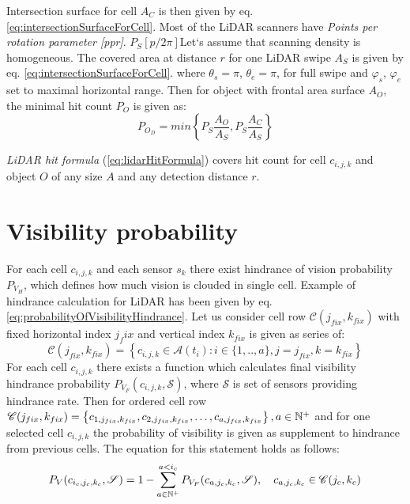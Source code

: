 \noindent Intersection surface for cell $A_C$ is then given by eq. \ref{eq:intersectionSurfaceForCell}. Most of the LiDAR scanners have \textit{Points per rotation parameter [ppr]}. $P_S[p/2\pi]$Let`s  assume that scanning density is homogeneous. The covered area at distance $r$ for one LiDAR swipe $A_S$ is given by eq. \ref{eq:intersectionSurfaceForCell}. where $\theta_s=\pi$, $\theta_e=\pi$, for full swipe and $\varphi_s$, $\varphi_e$ set to maximal horizontal range. Then for object with frontal area surface $A_O$, the minimal hit count $P_O$ is given as:
\begin{equation}\label{eq:lidarHitFormula}
    P_{O_D} = \textit{min} \left\{P_S\frac{A_O}{A_S},P_S\frac{A_C}{A_S}\right\}
\end{equation}

\noindent \textit{LiDAR hit formula} (\ref{eq:lidarHitFormula}) covers hit count for cell $c_{i,j,k}$ and object $O$ of any size $A$ and any detection distance $r$.

\section{Visibility probability}\label{sec:visibilityProbability}
\noindent For each cell $c_{i,j,k}$ and each sensor $s_k$ there exist hindrance of vision probability $P_{V_H}$, which defines how much vision is clouded in single cell. Example of hindrance calculation for LiDAR has been given by eq. \ref{eq:probabilityOfVisibilityHindrance}. Let us consider cell row $\mathscr{C}(j_{fix},k_{fix})$ with fixed horizontal index $j_fix$ and vertical index $k_{fix}$ is given as series of:
\begin{equation}\label{eq:cellrowDefinition}
    \mathscr{C}(j_{fix},k_{fix})= \left\{c_{i,j,k}\in\mathscr{A}(t_i):i\in\{1,..,a\},j=j_{fix},k=k_{fix}\right\}
\end{equation}
For each cell $c_{i,j,k}$ there exists a function which calculates final visibility hindrance probability $P_{V_F}(c_{i,j,k},\mathscr{S})$, where $\mathscr{S}$ is set of sensors providing hindrance rate. Then for ordered cell row $\mathscr{C}(j_{fix},k_{fix})=\left\{c_{1,j_{fix},k_{fix}}, c_{2,j_{fix},k_{fix}}, \dots,c_{a,j_{fix},k_{fix}}\right\}, a\in\mathbb{N}^+$ and for one selected cell $c_{i,j,k}$ the probability of visibility is given as supplement to hindrance from previous cells. The equation for this statement holds as follows:
\begin{equation}\label{eq:FinalVisibilityProbability}
    P_{V}(c_{i_c,j_c,k_c},\mathscr{S})= 1 - \sum_{a\in\mathbb{N}^+}^{a<i_c} P_{V_F}(c_{a,j_c,k_c},\mathscr{S}),\quad c_{a,j_c,k_c}\in\mathscr{C}(j_{c},k_{c})
\end{equation}

